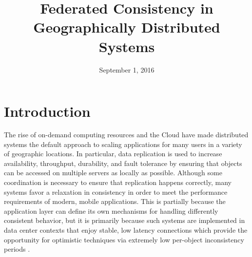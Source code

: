 \documentclass[10pt,conference,compsocconf,letterpaper]{IEEEtran}
\begin{document}
\title{Federated Consistency in Geographically Distributed Systems}
\author{
}


\date{September 1, 2016}


\maketitle

\IEEEdisplaynotcompsoctitleabstractindextext

\section{Introduction}

The rise of on-demand computing resources and the Cloud have made distributed systems the default approach to scaling applications for many users in a variety of geographic locations. In particular, data replication is used to increase availability, throughput, durability, and fault tolerance by ensuring that objects can be accessed on multiple servers as locally as possible. Although some coordination is necessary to ensure that replication happens correctly, many systems favor a relaxation in consistency in order to meet the performance requirements of modern, mobile applications. This is partially because the application layer can define its own mechanisms for handling differently consistent behavior, but it is primarily because such systems are implemented in data center contexts that enjoy stable, low latency connections which provide the opportunity for optimistic techniques via extremely low per-object inconsistency periods \cite{bailis_quantifying_2014,bermbach_metastorage:_2011}.
\end{document}
